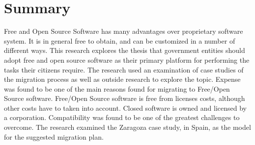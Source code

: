 \documentclass[a4paper, 12pt]{book}
\begin{document}
\chapter*{Summary}
\label{chap:summary}
	Free and Open Source Software has many advantages over proprietary software system. It is in general free to obtain, and can be customized in a number of different ways. This research explores the thesis that government entities should adopt free and open source software as their primary platform for performing the tasks their citizens require. The research used an examination of case studies of the migration process as well as outside research to explore the topic. Expense was found to be one of the main reasons found for migrating to Free/Open Source software. Free/Open Source software is free from licenses costs, although other costs have to taken into account. Closed software is owned and licensed by a corporation. Compatibility was found to be one of the greatest challenges to overcome. 
	The research examined the Zaragoza  case study, in Spain, as the model for the suggested migration plan. 




 


\appendix

\nocite{*}


\label{Bibliography}

\end{document}

